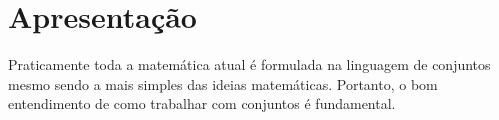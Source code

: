 \section{Apresentação}
Praticamente toda a matemática atual é formulada na linguagem de conjuntos mesmo sendo a mais simples das ideias matemáticas. Portanto, o bom entendimento de como trabalhar com conjuntos é fundamental. 